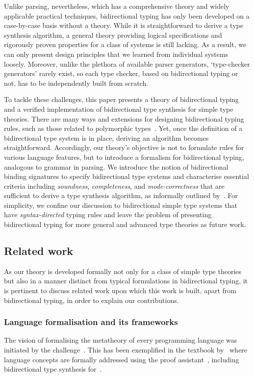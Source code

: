 Unlike parsing, nevertheless, which has a comprehensive theory and widely applicable practical techniques, bidirectional typing has only been developed on a case-by-case basis without a theory.
While it is straightforward to derive a type synthesis algorithm, a general theory providing logical specifications and rigorously proven properties for a class of systems is still lacking.
As a result, we can only present design principles that we learned from individual systems loosely.
Moreover, unlike the plethora of available parser generators, `type-checker generators' rarely exist, so each type checker, based on bidirectional typing or not, has to be independently built from scratch.

To tackle these challenges, this paper presents a theory of bidirectional typing and a verified implementation of bidirectional type synthesis for simple type theories.
There are many ways and extensions for designing bidirectional typing rules, such as those related to polymorphic types~\citep{Pierce2000,Peyton-Jones2007,Dunfield2013,Xie2018}.
Yet, once the definition of a bidirectional type system is in place, deriving an algorithm becomes straightforward.
Accordingly, our theory's objective is not to formulate rules for various language features, but to introduce a formalism for bidirectional typing, analogous to grammar in parsing.
We introduce the notion of bidirectional binding signatures to specify bidirectional type systems and characterise essential criteria including \emph{soundness}, \emph{completeness}, and \emph{mode-correctness} that are sufficient to derive a type synthesis algorithm, as informally outlined by~\citet{Dunfield2021}.
For simplicity, we confine our discussion to bidirectional simple type systems that have \emph{syntax-directed} typing rules and leave the problem of presenting bidirectional typing for more general and advanced type theories as future work.

\subsection{Related work}\label{sec:related-work}
As our theory is developed formally not only for a class of simple type theories but also in a manner distinct from typical formulations in bidirectional typing, it is pertinent to discuss related work upon which this work is built, apart from bidirectional typing, in order to explain our contributions.

\subsubsection{Language formalisation and its frameworks} \label{sec:language-formalisation}
The vision of formalising the metatheory of every programming language was initiated by the \PoplMark challenge~\citep{Aydemir2005}.
This has been exemplified in the textbook by~\citet{Wadler2022} where language concepts are formally addressed using the proof assistant~\Agda, including bidirectional type synthesis for~\PCF.

